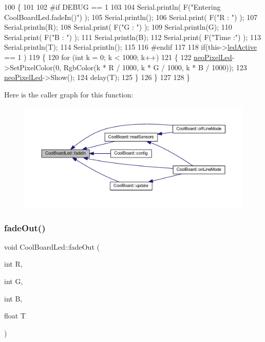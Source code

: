 \begin{DoxyCode}
100 \{
101 
102 \textcolor{preprocessor}{#if DEBUG == 1}
103 
104     Serial.println( F(\textcolor{stringliteral}{"Entering CoolBoardLed.fadeIn()"}) );
105     Serial.println();
106     Serial.print( F(\textcolor{stringliteral}{"R : "}) );
107     Serial.println(R);
108     Serial.print( F(\textcolor{stringliteral}{"G : "}) );
109     Serial.println(G);
110     Serial.print( F(\textcolor{stringliteral}{"B : "}) );
111     Serial.println(B);
112     Serial.print( F(\textcolor{stringliteral}{"Time :"}) );
113     Serial.println(T);
114     Serial.println();
115 
116 \textcolor{preprocessor}{#endif  }
117     
118     \textcolor{keywordflow}{if}(this->\hyperlink{class_cool_board_led_a5f17c135516fcf4b44ea8a096ba0177a}{ledActive} == 1 )
119     \{
120         \textcolor{keywordflow}{for} (\textcolor{keywordtype}{int} k = 0; k < 1000; k++) 
121         \{
122             \hyperlink{class_cool_board_led_ac2c13fa462a010cd9242bf297c013923}{neoPixelLed}->SetPixelColor(0, RgbColor(k * R / 1000, k * G / 1000, k * B / 1000));
123             \hyperlink{class_cool_board_led_ac2c13fa462a010cd9242bf297c013923}{neoPixelLed}->Show();
124             delay(T);
125         \}
126     \}
127 
128 \}
\end{DoxyCode}
Here is the caller graph for this function\+:\nopagebreak
\begin{figure}[H]
\begin{center}
\leavevmode
\includegraphics[width=350pt]{de/dc0/class_cool_board_led_ab778f5e7bed0ab74e3906d82110493c3_icgraph}
\end{center}
\end{figure}
\mbox{\label{class_cool_board_led_a93d545679237e8cc858324367149775c}} 
\subsubsection{\texorpdfstring{fade\+Out()}{fadeOut()}}
{\footnotesize\ttfamily void Cool\+Board\+Led\+::fade\+Out (\begin{DoxyParamCaption}\item[{int}]{R,  }\item[{int}]{G,  }\item[{int}]{B,  }\item[{float}]{T }\end{DoxyParamCaption})}


